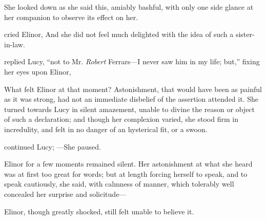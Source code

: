 She looked down as she said this, amiably bashful, with only one side glance at her companion to observe its effect on her.

 cried Elinor,  And she did not feel much delighted with the idea of such a sister-in-law.

 replied Lucy, “not to Mr. {\em Robert} Ferrars---I never saw him in my life; but,” fixing her eyes upon Elinor, 

What felt Elinor at that moment? Astonishment, that would have been as painful as it was strong, had not an immediate disbelief of the assertion attended it. She turned towards Lucy in silent amazement, unable to divine the reason or object of such a declaration; and though her complexion varied, she stood firm in incredulity, and felt in no danger of an hysterical fit, or a swoon.

 continued Lucy; ---She paused.

Elinor for a few moments remained silent. Her astonishment at what she heard was at first too great for words; but at length forcing herself to speak, and to speak cautiously, she said, with calmness of manner, which tolerably well concealed her surprise and solicitude---




Elinor, though greatly shocked, still felt unable to believe it.


